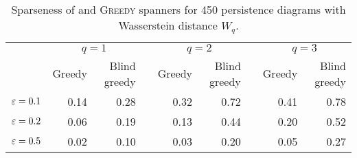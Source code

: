 \begin{table}\centering
\begin{tabular}{@{}rrrcrrcrr@{}}\toprule
                          & \multicolumn{2}{c}{$q=1$} & \phantom{abc} & \multicolumn{2}{c}{$q=2$} & \phantom{abc} & \multicolumn{2}{c}{$q=3$}\\
                          \cmidrule{2-3} \cmidrule{5-6} \cmidrule{8-9}
                          & Greedy & Blind greedy && Greedy & Blind greedy && Greedy & Blind greedy \\ \midrule
$\varepsilon = 0.1$                & 0.14  & 0.28         && 0.32  & 0.72      &&   0.41  & 0.78 \\
$\varepsilon = 0.2$                & 0.06 & 0.19          && 0.13 & 0.44       &&   0.20  & 0.52 \\
$\varepsilon = 0.5$               & 0.02 &  0.10          && 0.03 & 0.20        &&   0.05  & 0.27 \\
\bottomrule
\end{tabular}
    \caption{Sparseness of \bgrdy and \textsc{Greedy} spanners for 450  persistence diagrams
 with Wasserstein distance $W_q$.}
\label{tbl:mcgill_original_blind_greedy_spanner_sparseness}
\end{table}

